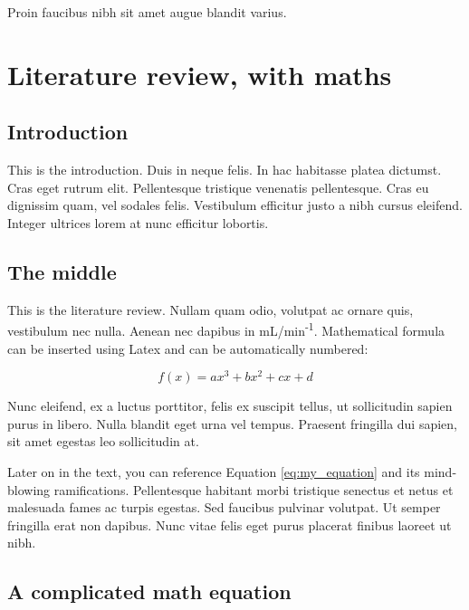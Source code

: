 \documentclass[12pt,a4paper,]{report}
\begin{document}
Proin faucibus nibh sit amet augue blandit varius.

\hypertarget{literature-review-with-maths}{%
\chapter{Literature review, with
maths}\label{literature-review-with-maths}}

\hypertarget{introduction}{%
\section{Introduction}\label{introduction}}

This is the introduction. Duis in neque felis. In hac habitasse platea
dictumst. Cras eget rutrum elit. Pellentesque tristique venenatis
pellentesque. Cras eu dignissim quam, vel sodales felis. Vestibulum
efficitur justo a nibh cursus eleifend. Integer ultrices lorem at nunc
efficitur lobortis.

\hypertarget{the-middle}{%
\section{The middle}\label{the-middle}}

This is the literature review. Nullam quam odio, volutpat ac ornare
quis, vestibulum nec nulla. Aenean nec dapibus in
mL/min\textsuperscript{-1}. Mathematical formula can be inserted using
Latex and can be automatically numbered:

\begin{equation}f(x) = ax^3 + bx^2 + cx + d\label{eq:my_equation}\end{equation}

Nunc eleifend, ex a luctus porttitor, felis ex suscipit tellus, ut
sollicitudin sapien purus in libero. Nulla blandit eget urna vel tempus.
Praesent fringilla dui sapien, sit amet egestas leo sollicitudin at.

Later on in the text, you can reference Equation \ref{eq:my_equation}
and its mind-blowing ramifications. Pellentesque habitant morbi
tristique senectus et netus et malesuada fames ac turpis egestas. Sed
faucibus pulvinar volutpat. Ut semper fringilla erat non dapibus. Nunc
vitae felis eget purus placerat finibus laoreet ut nibh.

\hypertarget{a-complicated-math-equation}{%
\section{A complicated math
equation}\label{a-complicated-math-equation}}
\end{document}
